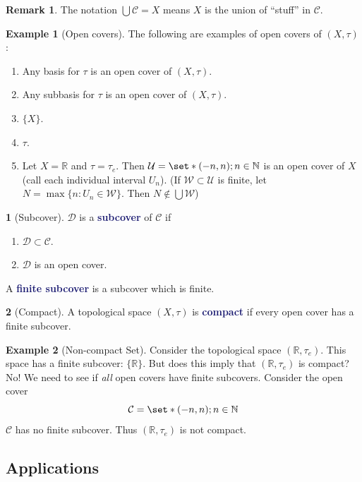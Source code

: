 \documentclass[11pt]{article}
\numberwithin{equation}{section}
\newcommand{\navy}[1]{\textcolor{MidnightBlue}{\bf #1}}
\theoremstyle{plain}
\theoremstyle{definition}
\newtheorem{definition}{\color{MidnightBlue}{\textbf{Definition}}}[section]
\newtheorem{example}{\color{WildStrawberry}Example}[section]
\newtheorem*{remark}{Remark}
\def\Set{\set*}%
\def\ss{\subset}
\newcommand{\1}{\mathbbm 1}
\def\t{\tau}
\newcommand{\RR}{\mathbb R}
\newcommand{\NN}{\mathbb N}
\newcommand{\cC}{\mathcal C}
\newcommand{\dD}{\mathcal D}
\newcommand{\wW}{\mathcal W}
\newcommand{\uU}{\mathcal U}
\begin{document}
\begin{remark}
	The notation $\bigcup \cC = X$ means $X$ is the union of ``stuff'' in $\cC$. 
\end{remark}

\begin{example}[Open covers]
	The following are examples of open covers of $(X,\t)$:
	\begin{enumerate}
		\item Any basis for $\t$ is an open cover of $(X,\t)$. 
		\item Any subbasis for $\t$ is an open cover of $(X,\t)$.
		\item $\{X\}$.
		\item $\t$.
		\item Let $X = \RR$ and $\t = \t_e$. Then $\uU = \Set{(-n,n); n \in \NN}$ is an open cover of $X$ (call each individual interval $U_n$). (If $\wW \ss \uU$ is finite, let $N = \max\{n : U_n \in \wW\}$. Then $N \not \in \bigcup \wW$)
	\end{enumerate}
\end{example}

\begin{definition}[Subcover]
	$\dD$ is a \navy{subcover} of $\cC$ if
	\begin{enumerate}
		\item $\dD \ss \cC$.
		\item $\dD$ is an open cover.  
	\end{enumerate}
	A \navy{finite subcover} is a subcover which is finite.
\end{definition}


\begin{definition}[Compact]
	A topological space $(X,\t)$ is \navy{compact} if every open cover has a finite subcover. 
\end{definition}

\begin{example}[Non-compact Set]
	Consider the topological space $(\RR,\t_e)$. This space has a finite subcover: $\{\RR\}$. But does this imply that $(\RR,\t_e)$ is compact? No! We need to see if \emph{all} open covers have finite subcovers. Consider the open cover
	\begin{equation}
		\cC = \Set{(-n,n); n \in \NN}
	\end{equation} 
	$\cC$ has no finite subcover. Thus $(\RR,\t_e)$ is not compact. 
\end{example}

\subsection{Applications}
\end{document}
